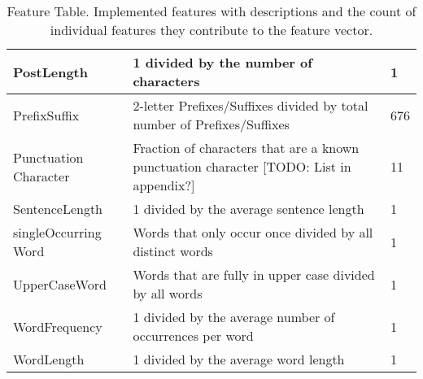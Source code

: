 \begin{table}[tbp]
\begin{tabular}{|p{2.6cm}|p{8.2cm}|p{1.2cm}|}
    PostLength           & 1 divided by the number of characters                                                                                                                                              & 1                 \\ \hline
    PrefixSuffix         & 2-letter Prefixes/Suffixes divided by total number of Prefixes/Suffixes                                                                                                            & 676               \\ \hline
    Punctuation Character & Fraction of characters that are a known punctuation character [TODO: List in appendix?]                                                                                                        & 11                \\ \hline
    SentenceLength       & 1 divided by the average sentence length                                                                                                                                           & 1                 \\ \hline
    singleOccurring Word  & Words that only occur once divided by all distinct words                                                                                                                           & 1                 \\ \hline
    UpperCaseWord        & Words that are fully in upper case divided by all words                                                                                                                            & 1                 \\ \hline
    WordFrequency        & 1 divided by the average number of occurrences per word                                                                                                                            & 1                 \\ \hline
    WordLength           & 1 divided by the average word length                                                                                                                                               & 1                 \\ \hline
    \end{tabular}
	\caption{Feature Table. Implemented features with descriptions and the count of individual features they contribute to the feature vector.}
	\label{tab:featureTable}
\end{table}
